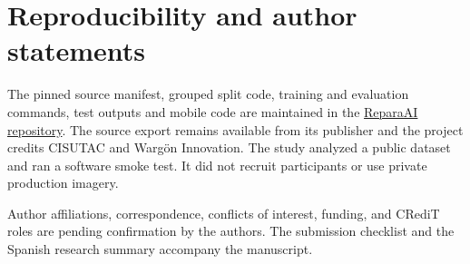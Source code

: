 \section*{Reproducibility and author statements}

The pinned source manifest, grouped split code, training and evaluation commands, test outputs and mobile code are maintained in the \href{https://github.com/OwerLopez/RepairAI}{ReparaAI repository}. The source export remains available from its publisher and the project credits CISUTAC and Warg\"on Innovation. The study analyzed a public dataset and ran a software smoke test. It did not recruit participants or use private production imagery.

Author affiliations, correspondence, conflicts of interest, funding, and CRediT roles are pending confirmation by the authors. The submission checklist and the Spanish research summary accompany the manuscript.
